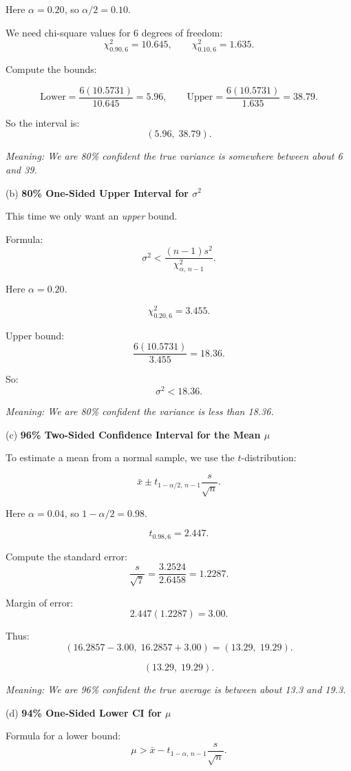\documentclass[11pt,letterpaper]{article}
\theoremstyle{remark}
\begin{document}
Here $\alpha = 0.20$, so $\alpha/2 = 0.10$.

We need chi-square values for 6 degrees of freedom:
\[
\chi^2_{0.90,6} = 10.645, \qquad
\chi^2_{0.10,6} = 1.635.
\]

Compute the bounds:

\[
\text{Lower} = \frac{6(10.5731)}{10.645} = 5.96,
\qquad
\text{Upper} = \frac{6(10.5731)}{1.635} = 38.79.
\]

So the interval is:
\[
\boxed{(5.96,\; 38.79)}.
\]

\textit{Meaning: We are 80\% confident the true variance is somewhere between about 6 and 39.}

\medskip
(b) \textbf{80\% One-Sided Upper Interval for $\sigma^2$}

This time we only want an \emph{upper} bound.

Formula:
\[
\sigma^2 < \frac{(n-1)s^2}{\chi^2_{\alpha,\, n-1}}.
\]

Here $\alpha = 0.20$.

\[
\chi^2_{0.20,6} = 3.455.
\]

Upper bound:
\[
\frac{6(10.5731)}{3.455} = 18.36.
\]

So:
\[
\boxed{\sigma^2 < 18.36}.
\]

\textit{Meaning: We are 80\% confident the variance is less than 18.36.}

\medskip
(c) \textbf{96\% Two-Sided Confidence Interval for the Mean $\mu$}

To estimate a mean from a normal sample, we use the $t$-distribution:

\[
\bar{x} \pm t_{1-\alpha/2,\, n-1}\frac{s}{\sqrt{n}}.
\]

Here $\alpha = 0.04$, so $1-\alpha/2 = 0.98$.

\[
t_{0.98,6} = 2.447.
\]

Compute the standard error:
\[
\frac{s}{\sqrt{7}} = \frac{3.2524}{2.6458} = 1.2287.
\]

Margin of error:
\[
2.447(1.2287) = 3.00.
\]

Thus:
\[
(16.2857 - 3.00,\; 16.2857 + 3.00)
= (13.29,\; 19.29).
\]

\[
\boxed{(13.29,\; 19.29)}.
\]

\textit{Meaning: We are 96\% confident the true average is between about 13.3 and 19.3.}

\medskip
(d) \textbf{94\% One-Sided Lower CI for $\mu$}

Formula for a lower bound:
\[
\mu > \bar{x} - t_{1-\alpha,\, n-1}\frac{s}{\sqrt{n}}.
\]
\end{document}
